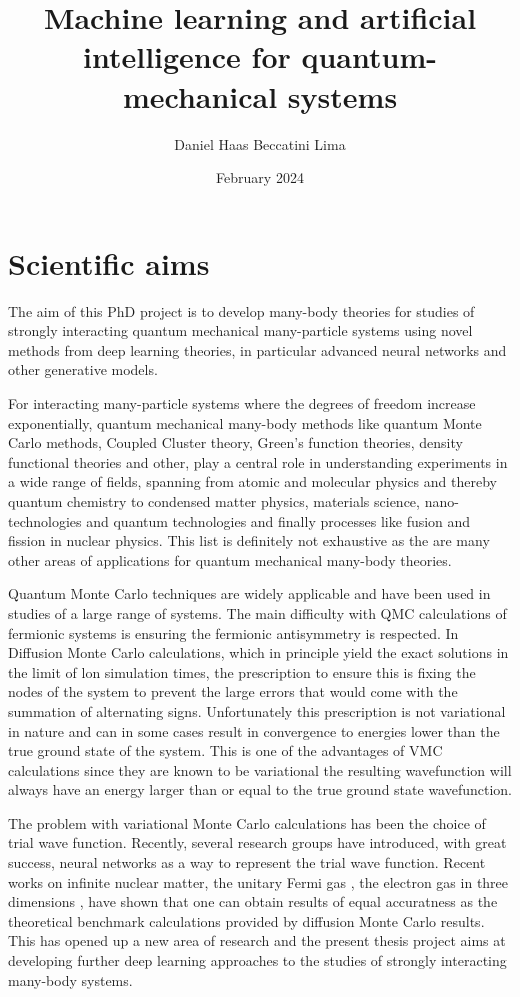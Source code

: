 \documentclass{article}
\title{Machine learning and artificial intelligence for quantum-mechanical systems}
\author{Daniel Haas Beccatini Lima}
\date{February 2024}
\begin{document}
\maketitle  

\section{Scientific aims}


The aim of this PhD project is to develop many-body theories for
studies of strongly interacting quantum mechanical many-particle
systems using novel methods from deep learning theories, in particular
advanced neural networks and other generative models.

For interacting many-particle systems
where the degrees of freedom increase exponentially, quantum
mechanical many-body methods like quantum Monte Carlo methods, Coupled Cluster theory, Green's
function theories, density functional theories and other, play a
central role in understanding experiments in a wide range of fields,
spanning from atomic and molecular physics and thereby quantum chemistry to
condensed matter physics, materials science, nano-technologies and
quantum technologies and finally processes like fusion and fission in
nuclear physics. This list is definitely not exhaustive as the are many other
areas of applications for quantum mechanical many-body theories.


Quantum Monte Carlo techniques are widely applicable and have been
used in studies of a large range of systems.  The main difficulty with QMC
calculations of fermionic systems is ensuring the fermionic
antisymmetry is respected. In Diffusion Monte Carlo calculations,
which in principle yield the exact solutions in the limit of lon
simulation times, the prescription to ensure this is fixing the nodes
of the system to prevent the large errors that would come with the
summation of alternating signs. Unfortunately this prescription is not
variational in nature and can in some cases result in convergence to
energies lower than the true ground state of the system. This is one
of the advantages of VMC calculations since they are known to be
variational the resulting wavefunction will always have an energy
larger than or equal to the true ground state wavefunction.

The problem with variational Monte Carlo calculations has been the
choice of trial wave function.  Recently, several research groups have
introduced, with great success, neural networks as a way to represent
the trial wave function. Recent works on infinite nuclear
matter\cite{us2023a}, the unitary Fermi gas \cite{us2023b}, the
electron gas in three dimensions \cite{us2024}, have shown that one
can obtain results of equal accuratness as the theoretical benchmark
calculations provided by diffusion Monte Carlo results.  This has
opened up a new area of research and the present thesis project aims
at developing further deep learning approaches to the studies of
strongly interacting many-body systems. 
\end{document}
